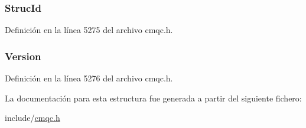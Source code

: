 \hypertarget{structtag_m_q_x_q_h_a0530922ca944569b52601d74941f96e4}{}
\subsubsection[{Struc\+Id}]{ Struc\+Id}\label{structtag_m_q_x_q_h_a0530922ca944569b52601d74941f96e4}


Definición en la línea 5275 del archivo cmqc.\+h.

\hypertarget{structtag_m_q_x_q_h_a0656ef8f766b3907d394d88a35d7b7e9}{}
\subsubsection[{Version}]{ Version}\label{structtag_m_q_x_q_h_a0656ef8f766b3907d394d88a35d7b7e9}


Definición en la línea 5276 del archivo cmqc.\+h.



La documentación para esta estructura fue generada a partir del siguiente fichero\+:\begin{DoxyCompactItemize}
\item 
include/\hyperlink{cmqc_8h}{cmqc.\+h}\end{DoxyCompactItemize}
